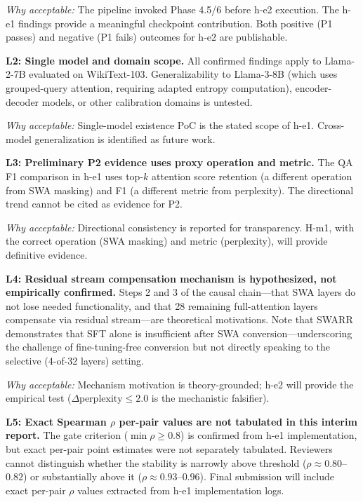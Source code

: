 \textit{Why acceptable:} The pipeline invoked Phase 4.5/6 before h-e2 execution. The h-e1 findings provide a meaningful checkpoint contribution. Both positive (P1 passes) and negative (P1 fails) outcomes for h-e2 are publishable.

\textbf{L2: Single model and domain scope.} All confirmed findings apply to Llama-2-7B evaluated on WikiText-103. Generalizability to Llama-3-8B (which uses grouped-query attention, requiring adapted entropy computation), encoder-decoder models, or other calibration domains is untested.

\textit{Why acceptable:} Single-model existence PoC is the stated scope of h-e1. Cross-model generalization is identified as future work.

\textbf{L3: Preliminary P2 evidence uses proxy operation and metric.} The QA F1 comparison in h-e1 uses top-$k$ attention score retention (a different operation from SWA masking) and F1 (a different metric from perplexity). The directional trend cannot be cited as evidence for P2.

\textit{Why acceptable:} Directional consistency is reported for transparency. H-m1, with the correct operation (SWA masking) and metric (perplexity), will provide definitive evidence.

\textbf{L4: Residual stream compensation mechanism is hypothesized, not empirically confirmed.} Steps 2 and 3 of the causal chain---that SWA layers do not lose needed functionality, and that 28 remaining full-attention layers compensate via residual stream---are theoretical motivations. Note that SWARR \cite{Liu2026Architecture} demonstrates that SFT alone is insufficient after SWA conversion---underscoring the challenge of fine-tuning-free conversion but not directly speaking to the selective (4-of-32 layers) setting.

\textit{Why acceptable:} Mechanism motivation is theory-grounded; h-e2 will provide the empirical test ($\Delta\text{perplexity} \leq 2.0$ is the mechanistic falsifier).

\textbf{L5: Exact Spearman $\rho$ per-pair values are not tabulated in this interim report.} The gate criterion ($\min \rho \geq 0.8$) is confirmed from h-e1 implementation, but exact per-pair point estimates were not separately tabulated. Reviewers cannot distinguish whether the stability is narrowly above threshold ($\rho \approx 0.80$--$0.82$) or substantially above it ($\rho \approx 0.93$--$0.96$). Final submission will include exact per-pair $\rho$ values extracted from h-e1 implementation logs.

